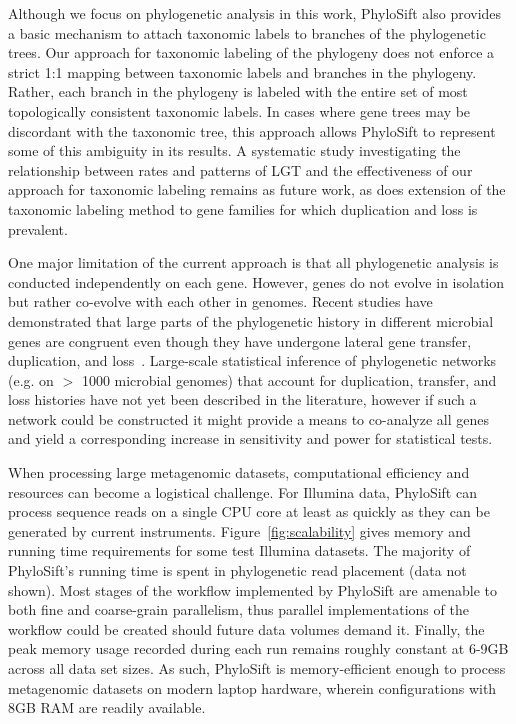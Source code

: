 \documentclass[10pt]{article}
\begin{document}
Although we focus on phylogenetic analysis in this work, PhyloSift also provides a basic mechanism to attach taxonomic labels to branches of the phylogenetic trees.
Our approach for taxonomic labeling of the phylogeny does not enforce a strict 1:1 mapping between taxonomic labels and branches in the phylogeny.
Rather, each branch in the phylogeny is labeled with the entire set of most topologically consistent taxonomic labels.
In cases where gene trees may be discordant with the taxonomic tree, this approach allows PhyloSift to represent some of this ambiguity in its results.
A systematic study investigating the relationship between rates and patterns of LGT and the effectiveness of our approach for taxonomic labeling remains as future work, as does extension of the taxonomic labeling method to gene families for which duplication and loss is prevalent.

One major limitation of the current approach is that all phylogenetic analysis is conducted independently on each gene.
However, genes do not evolve in isolation but rather co-evolve with each other in genomes.
Recent studies have demonstrated that large parts of the phylogenetic history in different microbial genes are congruent even though they have undergone lateral gene transfer, duplication, and loss~\cite{Szollosi2012,Boussau2012}.
Large-scale statistical inference of phylogenetic networks (e.g. on $>$ 1000 microbial genomes) that account for duplication, transfer, and loss histories have not yet been described in the literature, however if such a network could be constructed it might provide a means to co-analyze all genes and yield a corresponding increase in sensitivity and power for statistical tests.

When processing large metagenomic datasets, computational efficiency and resources can become a logistical challenge.
For Illumina data, PhyloSift can process sequence reads on a single CPU core at least as quickly as they can be generated by current instruments.
Figure~\ref{fig:scalability} gives memory and running time requirements for some test Illumina datasets.
The majority of PhyloSift's running time is spent in phylogenetic read placement (data not shown).
Most stages of the workflow implemented by PhyloSift are amenable to both fine and coarse-grain parallelism, thus parallel implementations of the workflow could be created should future data volumes demand it.
Finally, the peak memory usage recorded during each run remains roughly constant at 6-9GB across all data set sizes. 
As such, PhyloSift is memory-efficient enough to process metagenomic datasets on modern laptop hardware, wherein configurations with 8GB RAM are readily available.
\end{document}
